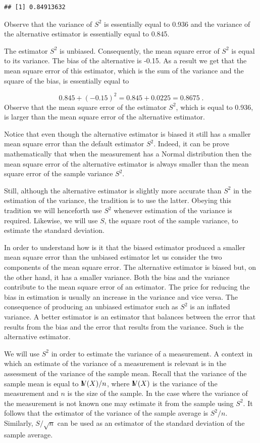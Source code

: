 \documentclass[]{krantz}
\newcommand{\Var}{{\rm I\kern-.3em V}}
\theoremstyle{definition}
\theoremstyle{definition}
\theoremstyle{definition}
\theoremstyle{remark}
\begin{document}
\begin{verbatim}
## [1] 0.84913632
\end{verbatim}

Observe that the variance of \(S^2\) is essentially equal to 0.936 and
the variance of the alternative estimator is essentially equal to 0.845.

The estimator \(S^2\) is unbiased. Consequently, the mean square error
of \(S^2\) is equal to its variance. The bias of the alternative is
-0.15. As a result we get that the mean square error of this estimator,
which is the sum of the variance and the square of the bias, is
essentially equal to

\[0.845 + (-0.15)^2 = 0.845 + 0.0225 = 0.8675\;.\] Observe that the mean
square error of the estimator \(S^2\), which is equal to 0.936, is
larger than the mean square error of the alternative estimator.

Notice that even though the alternative estimator is biased it still has
a smaller mean square error than the default estimator \(S^2\). Indeed,
it can be prove mathematically that when the measurement has a Normal
distribution then the mean square error of the alternative estimator is
always smaller than the mean square error of the sample variance
\(S^2\).

Still, although the alternative estimator is slightly more accurate than
\(S^2\) in the estimation of the variance, the tradition is to use the
latter. Obeying this tradition we will henceforth use \(S^2\) whenever
estimation of the variance is required. Likewise, we will use \(S\), the
square root of the sample variance, to estimate the standard deviation.

In order to understand how is it that the biased estimator produced a
smaller mean square error than the unbiased estimator let us consider
the two components of the mean square error. The alternative estimator
is biased but, on the other hand, it has a smaller variance. Both the
bias and the variance contribute to the mean square error of an
estimator. The price for reducing the bias in estimation is usually an
increase in the variance and vice versa. The consequence of producing an
unbiased estimator such as \(S^2\) is an inflated variance. A better
estimator is an estimator that balances between the error that results
from the bias and the error that results from the variance. Such is the
alternative estimator.

We will use \(S^2\) in order to estimate the variance of a measurement.
A context in which an estimate of the variance of a measurement is
relevant is in the assessment of the variance of the sample mean. Recall
that the variance of the sample mean is equal to \(\Var(X)/n\), where
\(\Var(X)\) is the variance of the measurement and \(n\) is the size of
the sample. In the case where the variance of the measurement is not
known one may estimate it from the sample using \(S^2\). It follows that
the estimator of the variance of the sample average is \(S^2/n\).
Similarly, \(S/\sqrt{n}\) can be used as an estimator of the standard
deviation of the sample average.
\end{document}
